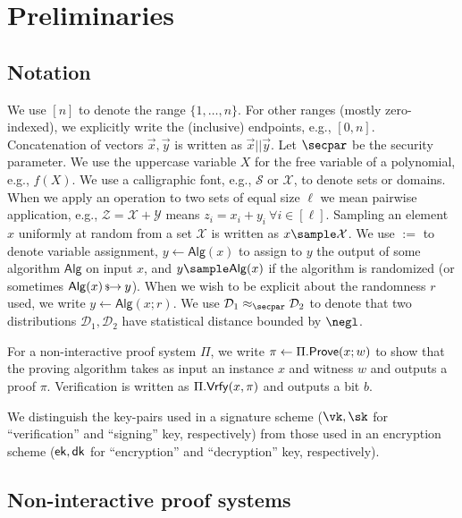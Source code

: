 \chapter{Preliminaries}\label{sec:prelims}
\minitoc

\section{Notation}
We use $[n]$ to denote the range $\{1, \dots, n\}$. For other ranges (mostly zero-indexed), we explicitly write the (inclusive) endpoints, e.g., $[0,n]$. 
Concatenation of vectors $\vec{x},\vec{y}$ is written as $\vec{x} || \vec{y}$. 
Let $\secpar$ be the security parameter.
We use the uppercase variable $X$ for the free variable of a polynomial, e.g., $f(X)$. 
We use a calligraphic font, e.g., $\mathcal{S}$ or $\mathcal{X}$, to denote sets or domains. When we apply an operation to two sets of equal size $\ell$ we mean pairwise application, e.g., $\mathcal{Z} = \mathcal{X} + \mathcal{Y}$ means $z_i = x_i + y_i~\forall{i \in [\ell]}$. 
Sampling an element $x$ uniformly at random from a set $\mathcal{X}$ is written as $x \sample \mathcal{X}$. 
We use $:=$ to denote variable assignment, $y \gets \mathsf{Alg}(x)$ to assign to $y$ the output of some algorithm $\mathsf{Alg}$ on input $x$, and $y \sample \mathsf{Alg}(x)$ if the algorithm is randomized (or sometimes $\mathsf{Alg}(x) \,{\mbox{\scriptsize${\$}$\normalsize}\!\!\to}\hskip2.3pt y$). When we wish to be explicit about the randomness $r$ used, we write $y \gets \mathsf{Alg}(x; r)$. We use $\mathcal{D}_1 \approx_\secpar \mathcal{D}_2$ to denote that two distributions $\mathcal{D}_1, \mathcal{D}_2$ have statistical distance bounded by $\negl$.

For a non-interactive proof system $\Pi$, we write $\pi \gets \Pi.\mathsf{Prove}(x; w)$ to show that the proving algorithm takes as input an instance $x$ and witness $w$ and outputs a proof $\pi$. Verification is written as $\Pi.\mathsf{Vrfy}(x, \pi)$ and outputs a bit $b$. 

We distinguish the key-pairs used in a signature scheme ($\vk, \sk$ for ``verification'' and ``signing'' key, respectively) from those used in an encryption scheme ($\mathsf{ek}, \mathsf{dk}$ for ``encryption'' and ``decryption'' key, respectively). 

\section{Non-interactive proof systems}\label{sec:nizks}

